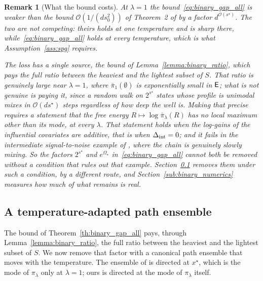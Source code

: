 \documentclass[aos]{imsart}%
\newcommand{\OO}{\mathcal{O}}  %
\theoremstyle{plain}
\newtheorem{remark}{Remark}[section]
\theoremstyle{definition}
\begin{document}
    \begin{remark}[What the bound costs]
        \label{rem:binary_price}
        At $\lambda=1$ the bound~\eqref{eq:binary_gap_all} is weaker than the
        bound $\OO(1/(ds_0^{2}))$ of Theorem~2 of
        \citet{YangWainwrightJordan2016} by a factor $d^{\OO(s^{\star})}$. The
        two are not competing: theirs holds at one temperature and is sharp
        there, while~\eqref{eq:binary_gap_all} holds at every temperature,
        which is what Assumption~\ref{ass:spg} requires.

        The loss has a single source, the bound of
        Lemma~\ref{lemma:binary_ratio}, which pays the full ratio between the
        heaviest and the lightest subset of $S$. That ratio is genuinely large
        near $\lambda=1$, where $\bar\pi_1(\emptyset)$ is exponentially small
        in $\mathsf{E}$; what is not genuine is paying it, since a random walk on
        $2^{s^{\star}}$ states whose profile is unimodal mixes in
        $\OO(ds^{\star})$ steps regardless of how deep the well is. Making
        that precise requires a statement that the free energy
        $R\mapsto\log\bar\pi_\lambda(R)$ has no local maximum other than its
        mode, at every $\lambda$. That statement holds when the log-gains of
        the influential covariates are additive, that is when
        $\Delta_{\mathrm{int}}=0$; and it fails in the intermediate signal-to-noise example
        of \citet[Appendix~B]{YangWainwrightJordan2016}, where the chain is
        genuinely slowly mixing. So the factors $2^{s^{\star}}$ and
        $e^{\Omega_\star}$ in~\eqref{eq:binary_gap_all} cannot both be removed
        without a condition that rules out that example.
        Section~\ref{sub:binary_adapted} removes them under such a condition,
        by a different route, and Section~\ref{sub:binary_numerics} measures
        how much of what remains is real.
    \end{remark}


    \subsection{A temperature-adapted path ensemble}
    \label{sub:binary_adapted}

    The bound of Theorem~\ref{th:binary_gap_all} pays, through
    Lemma~\ref{lemma:binary_ratio}, the full ratio between the heaviest and the
    lightest subset of $S$. We now remove that factor with a canonical path
    ensemble that moves with the temperature. The ensemble of
    \citet{YangWainwrightJordan2016} is directed at $x^{\star}$, which is the
    mode of $\pi_\lambda$ only at $\lambda=1$; ours is directed at the mode of
    $\pi_\lambda$ itself.
\end{document}
